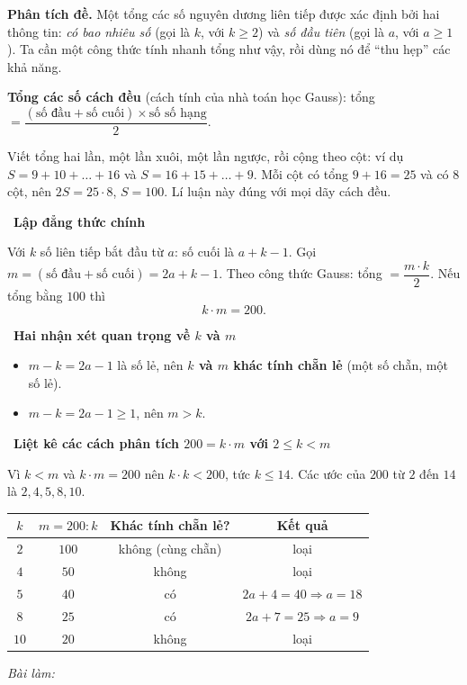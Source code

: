 \documentclass[11pt]{article}
\newif\ifsol \solfalse
\newcommand{\probsol}[1]{%
  \begin{lrbox}{\solmeasure}\begin{minipage}{\dimexpr\linewidth-24pt\relax}#1\end{minipage}\end{lrbox}%
  \ifsol
    \begin{solbox}#1\end{solbox}%
  \else
    \setlength{\solht}{\dimexpr\ht\solmeasure+\dp\solmeasure+0.85cm\relax}%
    \ifdim\solht<1.35cm\setlength{\solht}{1.35cm}\fi
    \ifdim\solht>\StudentMaxWork\setlength{\solht}{\StudentMaxWork}\fi
    \begin{tcolorbox}[colback=white,colframe=Line,boxrule=0.8pt,arc=5pt,
      left=8pt,right=8pt,top=4pt,bottom=4pt,height=\solht]{\footnotesize\color{Slate}\itshape\WorkWord}\end{tcolorbox}%
  \fi}
\newlength{\StudentMaxWork}\setlength{\StudentMaxWork}{7.5cm}
\newcommand{\step}[2]{\par\smallskip\noindent{\bfseries\color{tmBlue!85!black}\StepWord~#1.}\ {\bfseries #2}\par\nopagebreak}
\def\WorkWord{Bài làm:}
\def\StepWord{Bước}
\begin{document}
\probsol{
\textbf{Phân tích đề.} Một tổng các số nguyên dương liên tiếp được xác định bởi hai thông tin: \emph{có bao nhiêu số} (gọi là $k$, với $k\ge 2$) và \emph{số đầu tiên} (gọi là $a$, với $a\ge 1$). Ta cần một công thức tính nhanh tổng như vậy, rồi dùng nó để ``thu hẹp'' các khả năng.

\begin{recallbox}\textbf{Tổng các số cách đều} (cách tính của nhà toán học Gauss): tổng $=\dfrac{(\text{số đầu}+\text{số cuối})\times\text{số số hạng}}{2}$.\end{recallbox}

\begin{proofbox}Viết tổng hai lần, một lần xuôi, một lần ngược, rồi cộng theo cột: ví dụ $S=9+10+\dots+16$ và $S=16+15+\dots+9$. Mỗi cột có tổng $9+16=25$ và có $8$ cột, nên $2S=25\cdot 8$, $S=100$. Lí luận này đúng với mọi dãy cách đều.\end{proofbox}

\step{1}{Lập đẳng thức chính}
Với $k$ số liên tiếp bắt đầu từ $a$: số cuối là $a+k-1$. Gọi $m=(\text{số đầu}+\text{số cuối})=2a+k-1$. Theo công thức Gauss: tổng $=\dfrac{m\cdot k}{2}$. Nếu tổng bằng $100$ thì
\[k\cdot m=200.\]

\step{2}{Hai nhận xét quan trọng về $k$ và $m$}
\begin{itemize}[leftmargin=1.4em,itemsep=1pt]
\item $m-k=2a-1$ là số lẻ, nên \textbf{$k$ và $m$ khác tính chẵn lẻ} (một số chẵn, một số lẻ).
\item $m-k=2a-1\ge 1$, nên \textbf{$m>k$}.
\end{itemize}

\step{3}{Liệt kê các cách phân tích $200=k\cdot m$ với $2\le k<m$}
Vì $k<m$ và $k\cdot m=200$ nên $k\cdot k<200$, tức $k\le 14$. Các ước của $200$ từ $2$ đến $14$ là $2,4,5,8,10$.
\begin{center}
\begin{tabular}{|c|c|c|c|}
\hline
\rowcolor{Tint}$k$ & $m=200:k$ & Khác tính chẵn lẻ? & Kết quả\\
\hline
$2$ & $100$ & không (cùng chẵn) & loại\\
$4$ & $50$ & không & loại\\
$5$ & $40$ & có & $2a+4=40\Rightarrow a=18$\\
$8$ & $25$ & có & $2a+7=25\Rightarrow a=9$\\
$10$ & $20$ & không & loại\\
\hline
\end{tabular}
\end{center}

}
\end{document}
